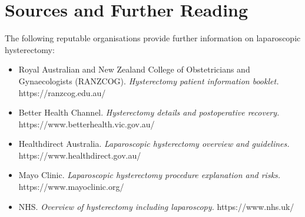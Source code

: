 \section*{Sources and Further Reading}
The following reputable organisations provide further information on laparoscopic hysterectomy:
\begin{itemize}
    \item Royal Australian and New Zealand College of Obstetricians and Gynaecologists (RANZCOG). \textit{Hysterectomy patient information booklet.} https://ranzcog.edu.au/
    \item Better Health Channel. \textit{Hysterectomy details and postoperative recovery.} https://www.betterhealth.vic.gov.au/
    \item Healthdirect Australia. \textit{Laparoscopic hysterectomy overview and guidelines.} https://www.healthdirect.gov.au/
    \item Mayo Clinic. \textit{Laparoscopic hysterectomy procedure explanation and risks.} https://www.mayoclinic.org/
    \item NHS. \textit{Overview of hysterectomy including laparoscopy.} https://www.nhs.uk/
\end{itemize}
